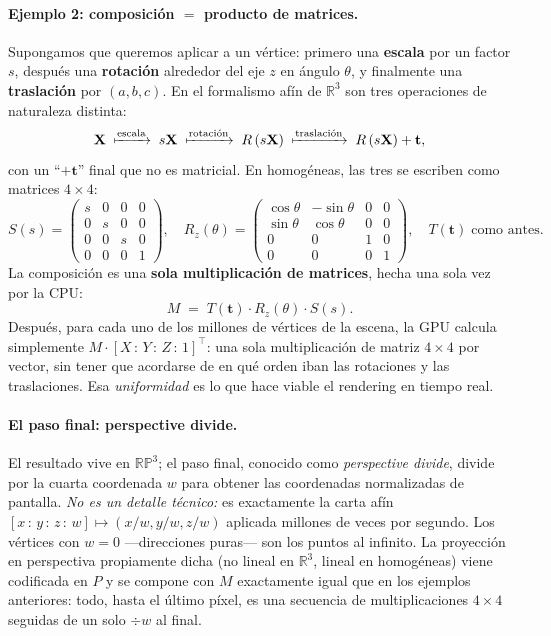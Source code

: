 \documentclass[11pt,a4paper]{article}
\newcommand{\RP}{\mathbb{RP}}
\newcommand{\R}{\mathbb{R}}
\newcommand{\hpf}[4]{[#1\,{:}\,#2\,{:}\,#3\,{:}\,#4]}
\begin{document}
\paragraph{Ejemplo 2: composición $=$ producto de matrices.}
Supongamos que queremos aplicar a un vértice: primero una \textbf{escala}
por un factor $s$, después una \textbf{rotación} alrededor del eje $z$
en ángulo $\theta$, y finalmente una \textbf{traslación} por
$(a,b,c)$. En el formalismo afín de $\R^3$ son tres operaciones de
naturaleza distinta:
\[
  \mathbf X
  \;\xmapsto{\text{escala}}\;
  s\mathbf X
  \;\xmapsto{\text{rotación}}\;
  R\,(s\mathbf X)
  \;\xmapsto{\text{traslación}}\;
  R\,(s\mathbf X)+\mathbf t,
\]
con un ``$+\mathbf t$'' final que no es matricial. En homogéneas, las
tres se escriben como matrices $4\times 4$:
\[
  S(s)=\!\begin{pmatrix} s&0&0&0\\0&s&0&0\\0&0&s&0\\0&0&0&1\end{pmatrix}\!,
  \quad
  R_z(\theta)=\!\begin{pmatrix} \cos\theta&-\sin\theta&0&0\\ \sin\theta&\cos\theta&0&0\\0&0&1&0\\0&0&0&1\end{pmatrix}\!,
  \quad
  T(\mathbf t)\;\text{como antes.}
\]
La composición es una \textbf{sola multiplicación de matrices}, hecha
una sola vez por la CPU:
\[
  M \;=\; T(\mathbf t)\cdot R_z(\theta)\cdot S(s).
\]
Después, para cada uno de los millones de vértices de la escena, la GPU
calcula simplemente $M\cdot\hpf{X}{Y}{Z}{1}^{\top}$: una sola
multiplicación de matriz $4\times 4$ por vector, sin tener que
acordarse de en qué orden iban las rotaciones y las traslaciones. Esa
\emph{uniformidad} es lo que hace viable el rendering en tiempo real.

\paragraph{El paso final: perspective divide.}
El resultado vive en $\RP^3$; el paso final, conocido como
\emph{perspective divide}, divide por la cuarta coordenada $w$ para
obtener las coordenadas normalizadas de pantalla. \emph{No es un detalle
técnico:} es exactamente la carta afín
$\hpf{x}{y}{z}{w}\mapsto(x/w,y/w,z/w)$ aplicada millones de veces por
segundo. Los vértices con $w=0$ —direcciones puras— son los puntos al
infinito. La proyección en perspectiva propiamente dicha
(no lineal en $\R^3$, lineal en homogéneas) viene codificada en $P$ y
se compone con $M$ exactamente igual que en los ejemplos anteriores:
todo, hasta el último píxel, es una secuencia de multiplicaciones
$4\times 4$ seguidas de un solo $\div w$ al final.
\end{document}
